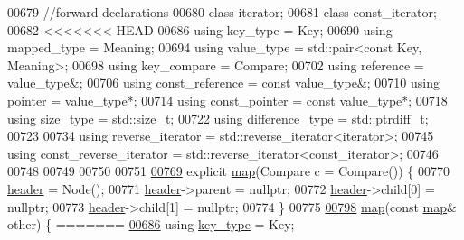 \begin{DoxyCode}
00679     \textcolor{comment}{//forward declarations}
00680     \textcolor{keyword}{class }iterator;
00681     \textcolor{keyword}{class }const\_iterator;
00682 
<<<<<<< HEAD
00686     \textcolor{keyword}{using} key\_type = Key;
00690     \textcolor{keyword}{using} mapped\_type = Meaning;
00694     \textcolor{keyword}{using} value\_type = std::pair<const Key, Meaning>;
00698     \textcolor{keyword}{using} key\_compare = Compare;
00702     \textcolor{keyword}{using} reference = value\_type&;
00706     \textcolor{keyword}{using} const\_reference = \textcolor{keyword}{const} value\_type&;
00710     \textcolor{keyword}{using} pointer = value\_type*;
00714     \textcolor{keyword}{using} const\_pointer = \textcolor{keyword}{const} value\_type*;
00718     \textcolor{keyword}{using} size\_type = std::size\_t;
00722     \textcolor{keyword}{using} difference\_type = std::ptrdiff\_t;
00723 
00734     \textcolor{keyword}{using} reverse\_iterator = std::reverse\_iterator<iterator>;
00745     \textcolor{keyword}{using} const\_reverse\_iterator = std::reverse\_iterator<const\_iterator>;
00746 
00748 
00749 
00750 
00751 
\hypertarget{map2_8h_source_l00769}{}\hyperlink{classaed2_1_1map_a64da1d965b13eb28cdb3837bc17a18cf_a64da1d965b13eb28cdb3837bc17a18cf}{00769}     \textcolor{keyword}{explicit} \hyperlink{classaed2_1_1map_a64da1d965b13eb28cdb3837bc17a18cf_a64da1d965b13eb28cdb3837bc17a18cf}{map}(Compare c = Compare()) \{
00770         \hyperlink{classaed2_1_1map_a92d93f905c8ad73fba18fdc7e8915cce_a92d93f905c8ad73fba18fdc7e8915cce}{header} = Node();
00771         \hyperlink{classaed2_1_1map_a92d93f905c8ad73fba18fdc7e8915cce_a92d93f905c8ad73fba18fdc7e8915cce}{header}->parent = \textcolor{keyword}{nullptr};
00772         \hyperlink{classaed2_1_1map_a92d93f905c8ad73fba18fdc7e8915cce_a92d93f905c8ad73fba18fdc7e8915cce}{header}->child[0] = \textcolor{keyword}{nullptr};
00773         \hyperlink{classaed2_1_1map_a92d93f905c8ad73fba18fdc7e8915cce_a92d93f905c8ad73fba18fdc7e8915cce}{header}->child[1] = \textcolor{keyword}{nullptr};
00774     \}
00775 
\hypertarget{map2_8h_source_l00798}{}\hyperlink{classaed2_1_1map_a7a77950a3d8e637bfa7cf5dcd904f257_a7a77950a3d8e637bfa7cf5dcd904f257}{00798}     \hyperlink{classaed2_1_1map_a7a77950a3d8e637bfa7cf5dcd904f257_a7a77950a3d8e637bfa7cf5dcd904f257}{map}(\textcolor{keyword}{const} \hyperlink{classaed2_1_1map}{map}& other) \{
=======
\hyperlink{classaed2_1_1map_a4273e8812e7105a618df58a2c8b72b7d_a4273e8812e7105a618df58a2c8b72b7d}{00686}     \textcolor{keyword}{using} \hyperlink{classaed2_1_1map_a4273e8812e7105a618df58a2c8b72b7d_a4273e8812e7105a618df58a2c8b72b7d}{key\_type} = Key;

\end{DoxyCode}
